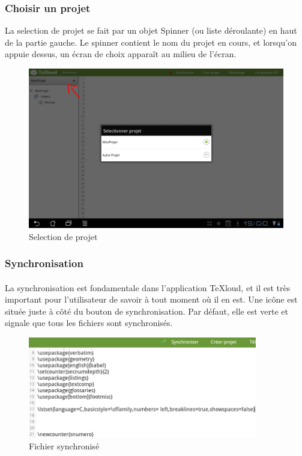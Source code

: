 \documentclass[a4paper,12pt]{article}
\begin{document}
\subsubsection{Choisir un projet}
La selection de projet se fait par un objet Spinner (ou liste déroulante) en haut de la partie gauche. Le spinner contient le nom du projet en cours, et lorsqu'on appuie dessus, un écran de choix apparaît au milieu de l'écran.
\begin{figure}[!ht]
\begin{center}
  \includegraphics[width=1\textwidth]{./images/screenshot/android_selectProject.png}
\end{center}
  \caption{Selection de projet}
  \label{Selection de projet}
\end{figure}

\newpage
\subsubsection{Synchronisation}

\paragraph*{}
La synchronisation est fondamentale dans l'application TeXloud, et il est très important pour l'utilisateur de savoir à tout moment où il en est. Une icône est située juste à côté du bouton de synchronisation. Par défaut, elle est verte et signale que tous les fichiers sont synchronisés.
\begin{figure}[!ht]
\begin{center}
  \includegraphics[width=10cm]{./images/screenshot/synchro1_android.png}
\end{center}
  \caption{Fichier synchronisé}
  \label{Fichier synchronisé}
\end{figure}
\end{document}
